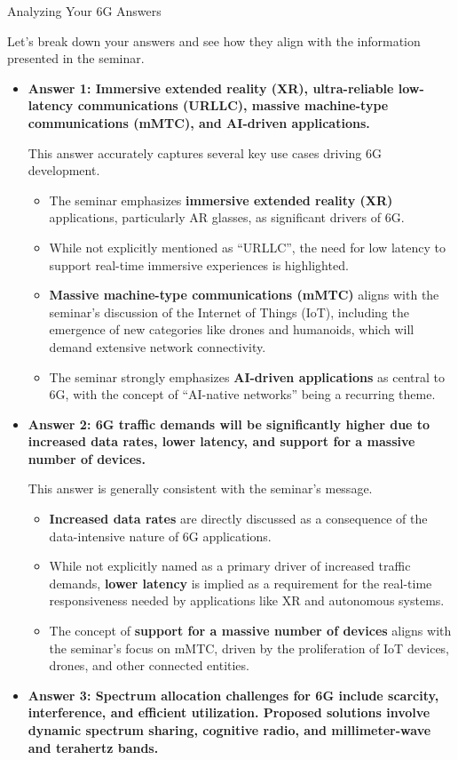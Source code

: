 \documentclass[
]{article}
\author{}
\date{}
\begin{document}
{Analyzing Your 6G
Answers}\label{analyzing-your-6g-answers}

Let's break down your answers and see how they align with the
information presented in the seminar.

\begin{itemize}
\item
  \textbf{Answer 1: Immersive extended reality (XR), ultra-reliable
  low-latency communications (URLLC), massive machine-type
  communications (mMTC), and AI-driven applications.}

  This answer accurately captures several key use cases driving 6G
  development.

  \begin{itemize}
  
  \item
    The seminar emphasizes \textbf{immersive extended reality (XR)}
    applications, particularly AR glasses, as significant drivers of 6G.
  \item
    While not explicitly mentioned as ``URLLC'', the need for low
    latency to support real-time immersive experiences is highlighted.
  \item
    \textbf{Massive machine-type communications (mMTC)} aligns with the
    seminar's discussion of the Internet of Things (IoT), including the
    emergence of new categories like drones and humanoids, which will
    demand extensive network connectivity.
  \item
    The seminar strongly emphasizes \textbf{AI-driven applications} as
    central to 6G, with the concept of ``AI-native networks'' being a
    recurring theme.
  \end{itemize}
\item
  \textbf{Answer 2: 6G traffic demands will be significantly higher due
  to increased data rates, lower latency, and support for a massive
  number of devices.}

  This answer is generally consistent with the seminar's message.

  \begin{itemize}
  
  \item
    \textbf{Increased data rates} are directly discussed as a
    consequence of the data-intensive nature of 6G applications.
  \item
    While not explicitly named as a primary driver of increased traffic
    demands, \textbf{lower latency} is implied as a requirement for the
    real-time responsiveness needed by applications like XR and
    autonomous systems.
  \item
    The concept of \textbf{support for a massive number of devices}
    aligns with the seminar's focus on mMTC, driven by the proliferation
    of IoT devices, drones, and other connected entities.
  \end{itemize}
\item
  \textbf{Answer 3: Spectrum allocation challenges for 6G include
  scarcity, interference, and efficient utilization. Proposed solutions
  involve dynamic spectrum sharing, cognitive radio, and millimeter-wave
  and terahertz bands.}


\end{itemize}
\end{document}
